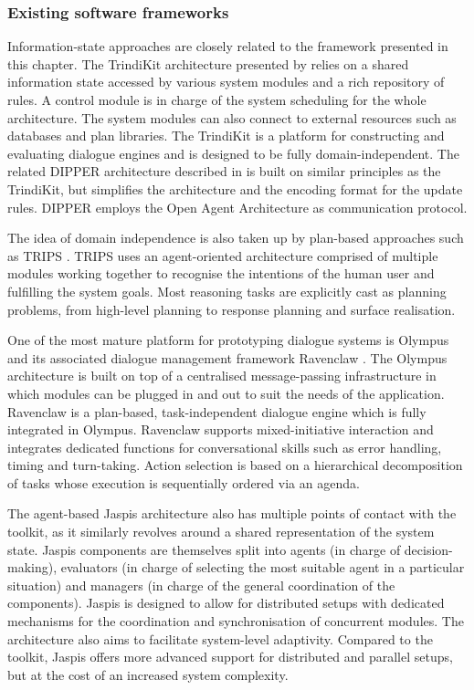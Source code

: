 \subsubsection*{Existing software frameworks}

Information-state approaches are closely related to the framework presented in this chapter. The TrindiKit architecture presented by \cite{Larsson:2000} relies on a shared information state accessed by various system modules and a rich repository of rules. A control module is in charge of the system scheduling for the whole architecture. The system modules can also connect to external resources such as databases and plan libraries.   The TrindiKit is a platform for constructing and evaluating dialogue engines and is designed to be fully domain-independent. The related DIPPER architecture described in \citep{Bos2003} is built on similar principles as the TrindiKit, but simplifies the architecture and the encoding format for the  update rules.  DIPPER employs the Open Agent Architecture as communication protocol.

The idea of domain independence is also taken up by plan-based approaches such as TRIPS \citep[The Rochester Interactive Planning System, cf. ][]{Allen:2000:AGD:973935.973937}. TRIPS uses an agent-oriented architecture comprised of multiple modules working together to recognise the intentions of the human user and fulfilling the system goals.  Most reasoning tasks are explicitly cast as planning problems, from high-level planning to response planning and surface realisation.  

One of the most mature platform for prototyping dialogue systems is Olympus and its associated dialogue management framework Ravenclaw \citep{Bohus:2007,Bohus:2009}.  The Olympus architecture is built on top of a centralised message-passing infrastructure in which modules can be plugged in and out to suit the needs of the application.  Ravenclaw is a plan-based, task-independent dialogue engine which is fully integrated in Olympus.  Ravenclaw supports mixed-initiative interaction and integrates dedicated functions for conversational skills such as error handling, timing and turn-taking. Action selection is based on a hierarchical decomposition of tasks whose execution is sequentially ordered via an agenda. 

The agent-based Jaspis architecture \citep{jaspis2004} also has multiple points of contact with the \opendial{} toolkit, as it similarly revolves around a shared representation of the system state.  Jaspis components are themselves split into agents (in charge of decision-making), evaluators (in charge of selecting the most suitable agent in a particular situation) and managers (in charge of the general coordination of the components). Jaspis is designed to allow for distributed setups with dedicated mechanisms for the coordination and synchronisation of concurrent modules.  The architecture also aims to facilitate system-level adaptivity.  Compared to the \opendial{} toolkit, Jaspis offers more advanced support for distributed and parallel setups, but at the cost of an increased system complexity.  

